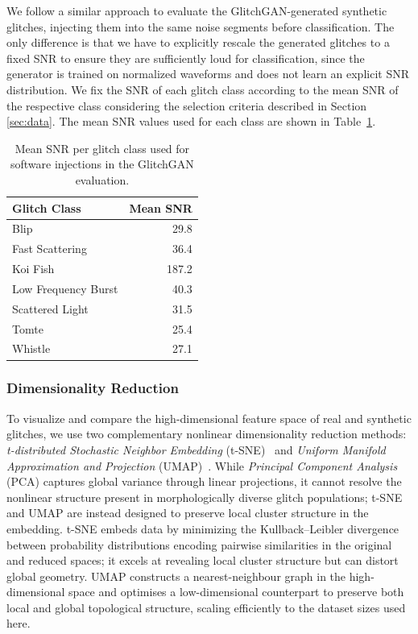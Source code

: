 \documentclass[reprint,nofootinbib,amsmath,amssymb,aps,floatfix]{revtex4-2}
\begin{document}
We follow a similar approach to evaluate the GlitchGAN-generated synthetic glitches, injecting them into the same noise segments before classification. 
The only difference is that we have to explicitly rescale the generated glitches to a fixed SNR to ensure they are sufficiently loud for classification, since the generator is trained on normalized waveforms and does not learn an explicit SNR distribution. 
We fix the SNR of each glitch class according to the mean SNR of the respective class considering the selection criteria described in Section \ref{sec:data}.
The mean SNR values used for each class are shown in Table~\ref{tab:injection_snr}.

\begin{table}[h]
\centering
\caption{Mean SNR per glitch class used for software injections in the GlitchGAN evaluation.}
\label{tab:injection_snr}
\begin{tabular}{l r}
\toprule
Glitch Class & Mean SNR \\
\midrule
Blip              & 29.8  \\
Fast Scattering   & 36.4  \\
Koi Fish          & 187.2 \\
Low Frequency Burst & 40.3 \\
Scattered Light   & 31.5  \\
Tomte             & 25.4  \\
Whistle           & 27.1  \\
\bottomrule
\end{tabular}
\end{table}


\subsubsection{Dimensionality Reduction}
To visualize and compare the high-dimensional feature space of real and synthetic glitches, we use two complementary nonlinear dimensionality reduction methods: \textit{t-distributed Stochastic Neighbor Embedding} (t-SNE)~\cite{TSNE} and \textit{Uniform Manifold Approximation and Projection} (UMAP)~\cite{Umap}. While \textit{Principal Component Analysis} (PCA) captures global variance through linear projections, it cannot resolve the nonlinear structure present in morphologically diverse glitch populations; t-SNE and UMAP are instead designed to preserve local cluster structure in the embedding. t-SNE embeds data by minimizing the Kullback--Leibler divergence between probability distributions encoding pairwise similarities in the original and reduced spaces; it excels at revealing local cluster structure but can distort global geometry. UMAP constructs a nearest-neighbour graph in the high-dimensional space and optimises a low-dimensional counterpart to preserve both local and global topological structure, scaling efficiently to the dataset sizes used here.
\end{document}
